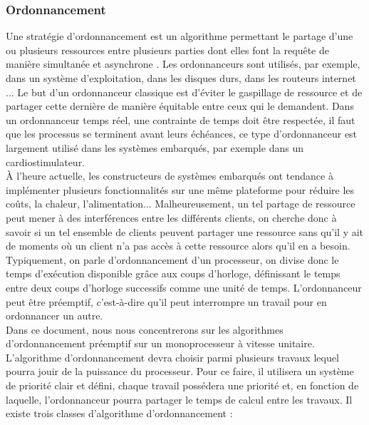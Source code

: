 \documentclass[12pt,a4paper,oneside]{book}
\theoremstyle{break}
\theoremstyle{breakplain}
\begin{document}
\subsubsection{Ordonnancement}
Une stratégie d'ordonnancement est un algorithme permettant le partage d'une ou plusieurs ressources entre plusieurs parties dont elles font la requête de manière simultanée et asynchrone \cite{goossens2014os}. Les ordonnanceurs sont utilisés, par exemple, dans un système d'exploitation, dans les disques durs, dans les routeurs internet ... Le but d'un ordonnanceur classique est d'éviter le gaspillage de ressource et de partager cette dernière de manière équitable entre ceux qui le demandent. Dans un ordonnanceur temps réel, une contrainte de temps doit être respectée, il faut que les processus se terminent avant leurs échéances, ce type d'ordonnanceur est largement utilisé dans les systèmes embarqués, par exemple dans un cardiostimulateur.\\

À l'heure actuelle, les constructeurs de systèmes embarqués ont tendance à implémenter plusieurs fonctionnalités sur une même plateforme pour réduire les coûts, la chaleur, l'alimentation... Malheureusement, un tel partage de ressource peut mener à des interférences entre les différents clients, on cherche donc à savoir si un tel ensemble de clients peuvent partager une ressource sans qu'il y ait de moments où un client n'a pas accès à cette ressource alors qu'il en a besoin.\\

Typiquement, on parle d'ordonnancement d'un processeur, on divise donc le temps d'exécution disponible grâce aux coups d'horloge, définissant le temps entre deux coups d'horloge successifs comme une unité de temps. L'ordonnanceur peut être préemptif, c'est-à-dire qu'il peut interrompre un travail pour en ordonnancer un autre.\\

Dans ce document, nous nous concentrerons sur les algorithmes d'ordonnancement préemptif sur un monoprocesseur à vitesse unitaire.\\

L'algorithme d'ordonnancement devra choisir parmi plusieurs travaux lequel pourra jouir de la puissance du processeur.  Pour ce faire, il utilisera un système de priorité clair et défini, chaque travail possédera une priorité et, en fonction de laquelle, l'ordonnanceur pourra partager le temps de calcul entre les travaux. Il existe trois classes d'algorithme d'ordonnancement \cite{goossens2014os} :\\
\end{document}
